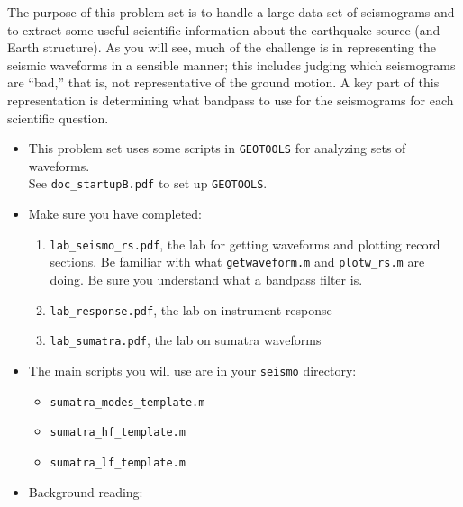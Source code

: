 \documentclass[11pt,titlepage,fleqn]{article}
\begin{document}
\begin{spacing}{1.0}

The purpose of this problem set is to handle a large data set of seismograms and to extract some useful scientific information about the earthquake source (and Earth structure). As you will see, much of the challenge is in representing the seismic waveforms in a sensible manner; this includes judging which seismograms are ``bad,'' that is, not representative of the ground motion. A key part of this representation is determining what bandpass to use for the seismograms for each scientific question.

\begin{itemize}
\item This problem set uses some scripts in \verb+GEOTOOLS+ for analyzing sets of waveforms. \\
See \verb+doc_startupB.pdf+ to set up \verb+GEOTOOLS+.


\item Make sure you have completed:
%
\begin{enumerate}
\item \verb+lab_seismo_rs.pdf+, the lab for getting waveforms and plotting record sections.
Be familiar with what \verb+getwaveform.m+ and \verb+plotw_rs.m+ are doing.
Be sure you understand what a bandpass filter is.

\item \verb+lab_response.pdf+, the lab on instrument response

\item \verb+lab_sumatra.pdf+, the lab on sumatra waveforms
\end{enumerate}


\item The main scripts you will use are in your \verb+seismo+ directory:
%
\begin{itemize}
\item \verb+sumatra_modes_template.m+
\item \verb+sumatra_hf_template.m+
\item \verb+sumatra_lf_template.m+
\end{itemize}


\item Background reading:


\end{itemize}
\end{spacing}
\end{document}
